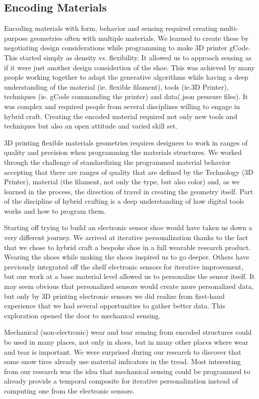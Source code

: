 \subsection{Encoding Materials}
Encoding materials with form, behavior and sensing required creating multi-purpose geometries often with multiple materials. We learned to create these by negotiating design considerations while programming to make 3D printer gCode. This started simply as  density vs. flexibility. It allowed us to approach sensing as if it were just another design considertion of the shoe. This was achieved by many people working together to adapt the generative algorithms while having a deep understanding of the material (ie. flexible filament), tools (ie.3D Printer), techniques (ie. gCode commanding the printer) and data(.json pressure files). It was complex and required people from several disciplines willing to engage in hybrid craft. Creating the encoded material required not only new tools and techniques but also an open attitude and varied skill set.

3D printing flexible materials geometries requires designers to work in ranges of quality and precision when programming the materials structures. We worked through the challenge of standardizing the programmed material behavior accepting that there are ranges of quality that are defined by the Technology (3D Printer), material (the filament, not only the type, but also color) and, as we learned in the process, the direction of travel in creating the geometry itself. Part of the discipline of hybrid crafting is a deep understanding of how digital tools works and how to program them.

Starting off trying to build an electronic sensor shoe would have taken us down a very different journey. We arrived at iterative personalization thanks to the fact that we chose to hybrid craft a bespoke shoe in a full wearable research product. Wearing the shoes while making the shoes inspired us to go deeper. Others have previously integrated off the shelf electronic sensors for iterative improvement, but our work at a base material level allowed us to personalize the sensor itself. It may seem obvious that personalized sensors would create more personalized data, but only by 3D printing electronic sensors we did realize from first-hand experience that we had several opportunities to gather better data. This exploration opened the door to mechanical sensing. 

 Mechanical (non-electronic) wear and tear sensing from encoded structures could be used in many places, not only in shoes, but in many other places where wear and tear is important. We were surprised during our research to discover that some snow tires already use material indicators in the tread. Most interesting from our research was the idea that mechanical sensing could be programmed to already provide a temporal composite for iterative personalization instead of computing one from the electronic sensors. 
 
